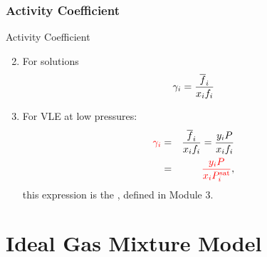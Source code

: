 \documentclass[10pt,compress,unknownkeysallowed]{beamer}
\begin{document}
\begin{frame}
  \frametitle{Activity Coefficient}
       \begin{block}{\begin{center}\normalsize{ Activity Coefficient}\end{center}}
            \begin{enumerate}\setcounter{enumi}{1}  
               \item<1-> For solutions
                  \begin{displaymath}
                     \gamma_{i} = \displaystyle\frac{\overline{f}_{i}}{x_{i}f_{i}}
                  \end{displaymath}
               \item<2-> For VLE at low pressures:
                  \begin{eqnarray}
                      \textcolor{red}{\gamma_{i}} &=& \displaystyle\frac{\overline{f}_{i}}{x_{i}f_{i}} = \displaystyle\frac{y_{i}P}{x_{i}f_{i}} \nonumber \\
                                        &=&  \textcolor{red}{\displaystyle\frac{y_{i}P}{x_{i}P_{i}^{\text{sat}}}}, \nonumber
                  \end{eqnarray}
                  this expression is the , defined in Module 3.
             \end{enumerate}
        \end{block}
         
\end{frame}
\normalsize

\section{Ideal Gas Mixture Model}
\end{document}
